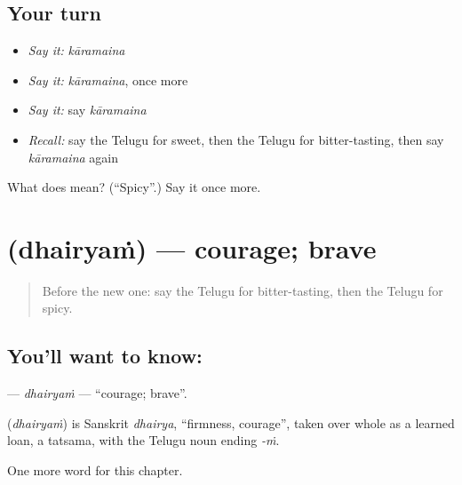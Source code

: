 \subsection*{Your turn}
\begin{itemize}
\raggedright
  \item \emph{Say it:} \emph{kāramaina}
  \item \emph{Say it:} \emph{kāramaina}, once more
  \item \emph{Say it:} say \emph{kāramaina}
  \item \emph{Recall:} say the Telugu for sweet, then the Telugu for bitter-tasting, then say \emph{kāramaina} again
\end{itemize}

\begin{tcolorbox}[breakable,colback=teal!4,colframe=teal!35!black,title={Before you move on}]
What does  mean? (\textquotedblleft{}Spicy\textquotedblright{}.) Say it once more.
\end{tcolorbox}
\section[\texorpdfstring{\te{ధైర్యం} (dhairyaṁ)}{ధైర్యం (dhairyaṁ)}]{ (dhairyaṁ) — courage; brave}

\label{lesson:TE-C141-dhairyam}



\begin{quote}
Before the new one: say the Telugu for bitter-tasting, then the Telugu for spicy.
\end{quote}

\subsection*{You'll want to know: }
\textbf{} — \emph{dhairyaṁ} — \textquotedblleft{}courage; brave\textquotedblright{}.

\begin{cousinweb}
\textbf{} (\emph{dhairyaṁ}) is Sanskrit \emph{dhairya}, \textquotedblleft{}firmness, courage\textquotedblright{}, taken over whole as a learned loan, a tatsama, with the Telugu noun ending \emph{-ṁ}.
\end{cousinweb}

\begin{grammarlens}[title={What you've built}]
One more word for this chapter.
\end{grammarlens}

